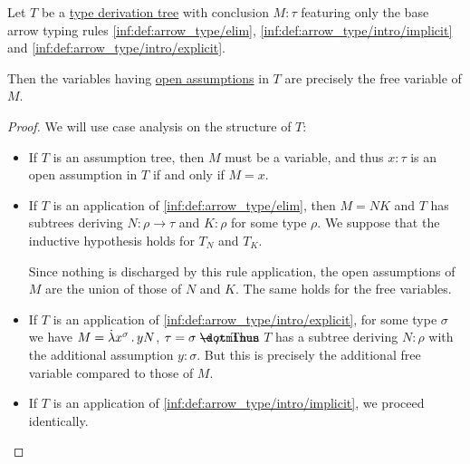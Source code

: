 \begin{proposition}\label{thm:assumptions_and_free_variables}
  Let \( T \) be a \hyperref[def:type_derivation_tree]{type derivation tree} with conclusion \( M: \tau \) featuring only the base arrow typing rules \ref{inf:def:arrow_type/elim}, \ref{inf:def:arrow_type/intro/implicit} and \ref{inf:def:arrow_type/intro/explicit}.

  Then the variables having \hyperref[def:type_derivation_tree/open]{open assumptions} in \( T \) are precisely the free variable of \( M \).
\end{proposition}
\begin{proof}
  We will use case analysis on the structure of \( T \):
  \begin{itemize}
    \item If \( T \) is an assumption tree, then \( M \) must be a variable, and thus \( x: \tau \) is an open assumption in \( T \) if and only if \( M = x \).

    \item If \( T \) is an application of \ref{inf:def:arrow_type/elim}, then \( M = NK \) and \( T \) has subtrees deriving \( N: \rho \to \tau \) and \( K: \rho \) for some type \( \rho \). We suppose that the inductive hypothesis holds for \( T_N \) and \( T_K \).

    Since nothing is discharged by this rule application, the open assumptions of \( M \) are the union of those of \( N \) and \( K \). The same holds for the free variables.

    \item If \( T \) is an application of \ref{inf:def:arrow_type/intro/explicit}, for some type \( \sigma \) we have \( M = \qabs {x^\sigma} y N \), \( \tau = \sigma \synimplies \rho \). Then \( T \) has a subtree deriving \( N: \rho \) with the additional assumption \( y: \sigma \). But this is precisely the additional free variable compared to those of \( M \).

    \item If \( T \) is an application of \ref{inf:def:arrow_type/intro/implicit}, we proceed identically.
  \end{itemize}
\end{proof}


